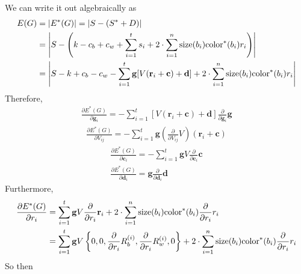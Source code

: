 \documentclass{amsart}
\def\v#1{\mathbf{#1}}
\begin{document}
We can write it out algebraically as
\begin{align*}
E(G) &= |E^*(G)| = |S - (S^* + D)|\\
  &= \left|S - \left(k - c_b + c_w + \sum_{ i = 1 }^t s_i
  + 2 \cdot \sum_{ i = 1 }^n \size{ b_i } \colorp{ b_i } r_i\right)\right|\\
  &= \left|S - k + c_b - c_w - \sum_{ i = 1 }^t \v{ g }[V(\v{ r }_i + \v{ c }) + \v{ d }]
  + 2 \cdot \sum_{ i = 1 }^n \size{ b_i } \colorp{ b_i } r_i\right|
\end{align*}
Therefore,
\begin{gather*}
\frac{ \partial E^*(G) }{ \partial \v{ g }_i }
  = -\sum_{ i = 1 }^t [V(\v{ r }_i + \v{ c }) + \v{ d }] \frac{ \partial }{ \partial \v{ g }_i } \v{ g }
\end{gather*}
\begin{gather*}
\frac{ \partial E^*(G) }{ \partial V_{ i j } }
  = -\sum_{ i = 1 }^t \v{ g } \left(\frac{ \partial }{ \partial V_{ i j } } V\right)(\v{ r }_i + \v{ c })
\end{gather*}
\begin{gather*}
\frac{ \partial E^*(G) }{ \partial \v{ c }_i }
  = - \sum_{ i = 1 }^t \v{ g } V \frac{ \partial }{ \partial \v{ c }_i } \v{ c }\\
\frac{ \partial E^*(G) }{ \partial \v{ d }_i } = \v{ g } \frac{ \partial }{ \partial \v{ d }_i } \v{ d }
\end{gather*}
Furthermore,
\begin{align*}
\frac{ \partial E^*(G) }{ \partial r_i }
  &= \sum_{ i = 1 }^t \v{ g } V \frac{ \partial }{ \partial r_i } \v{ r }_i
  + 2 \cdot \sum_{ i = 1 }^n \size{ b_i } \colorp{ b_i } \frac{ \partial }{ \partial r_i }  r_i\\
  &= \sum_{ i = 1 }^t \v{ g } V \left\{ 0, 0, \frac{ \partial }{ \partial r_i } R_b^{ (i) }, \frac{ \partial }{ \partial r_i } R_w^{ (i) }, 0 \right\}
  + 2 \cdot \sum_{ i = 1 }^n \size{ b_i } \colorp{ b_i } \frac{ \partial }{ \partial r_i }  r_i
\end{align*}
So then
\end{document}
